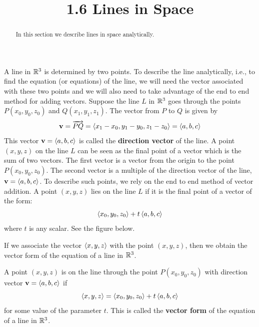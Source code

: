 \documentclass[handout]{ximera}
\title{1.6 Lines in Space}
\begin{document}
\begin{abstract}
In this section we describe lines in space analytically.
\end{abstract}
 
\maketitle

A line in $\mathbb R^3$ is determined by two points. To describe the line analytically, i.e., to find the equation (or equations) of the line,
we will need the vector associated with these two points and we will also need to take advantage of the end to end method for adding vectors.
Suppose the line $L$ in $\mathbb R^3$ goes through the points $P(x_0, y_0, z_0)$ and $Q(x_1, y_1, z_1)$. The vector from $P$ to $Q$ is given by
\[
\mathbf{v} = \overrightarrow{PQ} = \left\langle x_1-x_0,y_1-y_0,z_1-z_0\right\rangle = \left\langle a,b,c\right\rangle
\]
This vector $\mathbf v = \left\langle a,b,c\right\rangle$ is called the \textbf{direction vector} of the line. 
A point $(x, y, z)$ on the line $L$ can be seen as the final point of a vector which is the sum of two vectors.
The first vector is a vector from the origin to the point $P(x_0, y_0, z_0)$.
The second vector is a multiple of the direction vector of the line, $\mathbf v = \left\langle a, b, c\right\rangle$.
To describe such points, we rely on the end to end method of vector addition. A point $(x, y, z)$ lies on the line $L$ if
it is the final point of a vector of the form:
\[
\left\langle x_0, y_0, z_0\right\rangle + t\left\langle a, b, c\right\rangle
\]
where $t$ is any scalar. See the figure below.

\begin{image}
\end{image}
 
If we associate the vector $\left\langle x, y, z\right\rangle$ with the point $(x, y, z)$, then we obtain the vector form of the equation of a line in $\mathbb R^3$.

\begin{definition}
A point $(x, y, z)$ is on the line through the point $P(x_0, y_0, z_0)$ with direction vector $\mathbf v = \left\langle a, b, c\right\rangle$
if
\[
\left\langle x, y, z\right\rangle = \left\langle x_0, y_0, z_0\right\rangle + t\left\langle a, b, c\right\rangle
\]
for some value of the parameter $t$.
This is called the {\bf vector form} of the equation of a line in $\mathbb R^3$.
\end{definition}
\end{document}
